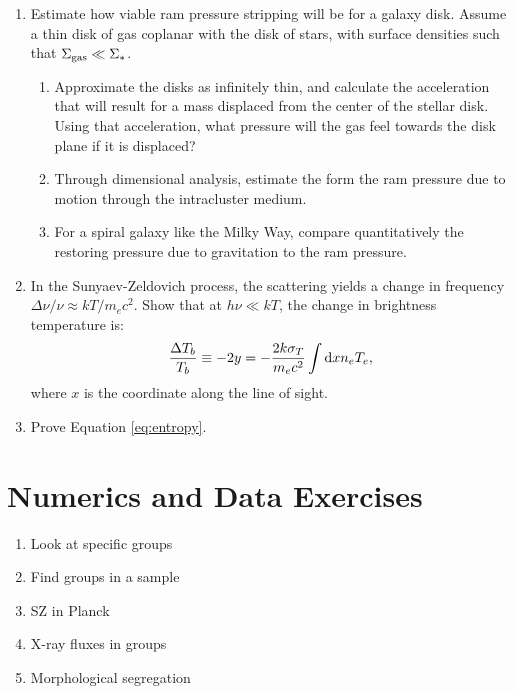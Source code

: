 \begin{enumerate}
\item Estimate how viable ram pressure stripping will be for a galaxy
    disk. Assume a thin disk of gas coplanar with the disk of stars,
    with surface densities such that $\Sigma_{\rm gas} \ll\Sigma_\ast$.
    \begin{enumerate}
    \item Approximate the disks as infinitely thin, and calculate the
    acceleration that will result for a mass displaced from the center
    of the stellar disk. Using that acceleration, what pressure will
    the gas feel towards the disk plane if it is displaced?
    \item Through dimensional analysis, estimate the form the ram
    pressure due to motion through the intracluster medium.
    \item For a spiral galaxy like the Milky Way, compare
    quantitatively the restoring pressure due to gravitation to the
    ram pressure.
    \end{enumerate}
\item In the Sunyaev-Zeldovich process, the scattering yields a change
    in frequency $\Delta\nu/\nu \approx kT/m_ec^2$. Show that at
    $h\nu\ll kT$, the change in brightness temperature is:
    \begin{equation}
   \frac{\Delta T_b}{T_b} \equiv -2y =
    - \frac{2k\sigma_T}{m_ec^2} \int {\rm d}x n_e T_e,
    \end{equation}
    where $x$ is the coordinate along the line of sight.
\item Prove Equation \ref{eq:entropy}.
\end{enumerate}

\section{Numerics and Data Exercises}

\begin{enumerate}
\item Look at specific groups
\item Find groups in a sample
\item SZ in Planck
\item X-ray fluxes in groups
\item Morphological segregation
\end{enumerate}


  
